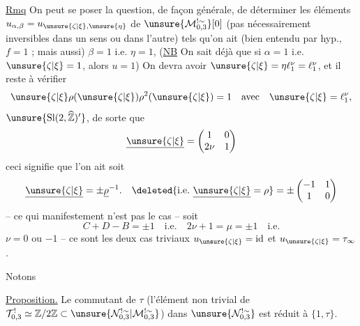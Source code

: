 \uline{Rmq} On peut se poser la question, de façon générale,
de déterminer les éléments
$u_{\alpha,\beta}=u_{\unsure{\zeta|\xi},\unsure{\eta}}$
de $\unsure{\mathcal M_{0,3}^{!\sim}}[0]$
(pas nécessairement inversibles dans un sens ou dans l'autre)
tels qu'on ait (bien entendu par hyp., $f=1$ ; mais aussi)
 $\beta=1$ i.e. $\eta=1$,
 
(\uline{NB} On sait déjà que si $\alpha=1$ i.e.
$\unsure{\zeta|\xi}=1$, alors $u=1$)
On devra avoir
$\unsure{\zeta|\xi}=\eta\ell_1^\nu=\ell_1^\nu$,
et il reste à vérifier
\[
\unsure{\zeta|\xi}\rho(\unsure{\zeta|\xi})
\rho^2(\unsure{\zeta|\xi})=1\quad\text{avec}\quad
\unsure{\zeta|\xi}=\ell_1^\nu,
\]
$\unsure{\mathrm{Sl}(2,\widehat{\mathbb Z})'}$,
 de sorte que
\[
\underline{\unsure{\zeta|\xi}}=
\begin{pmatrix}1&0\\2\nu&1\end{pmatrix}
\]
ceci signifie  que l'on ait soit
\[
\underline{\unsure{\zeta|\xi}}=\pm\underline\rho^{-1}.
\quad\deleted{\text{i.e.}\ \underline{\unsure{\zeta|\xi}}=\rho}
=\pm\begin{pmatrix}-1&1\\1&0\end{pmatrix}
\]
-- ce qui manifestement n'est pas le cas -- soit
\[
C+D-B=\pm1\quad\text{i.e.}\quad2\nu+1=\mu=\pm1\quad\text{i.e.}
\]
$\nu=0$ ou $-1$ -- ce sont les deux cas triviaux
$u_{\unsure{\zeta|\xi}}=\mathrm{id}$ et
$u_{\unsure{\zeta|\xi}}=\tau_\infty$.



Notons 

\uline{Proposition.} Le commutant de $\tau$ (l'élément
non trivial de $\mathcal T_{0,3}^{!}\simeq\mathbb Z/2\mathbb Z
\subset\unsure{\mathcal N_{0,3}^{!\sim}|\mathcal M_{0,3}^{!\sim}}$)
dans $\unsure{\mathcal N_{0,3}^{!\sim}}$ est réduit à $\{1,\tau\}$.



